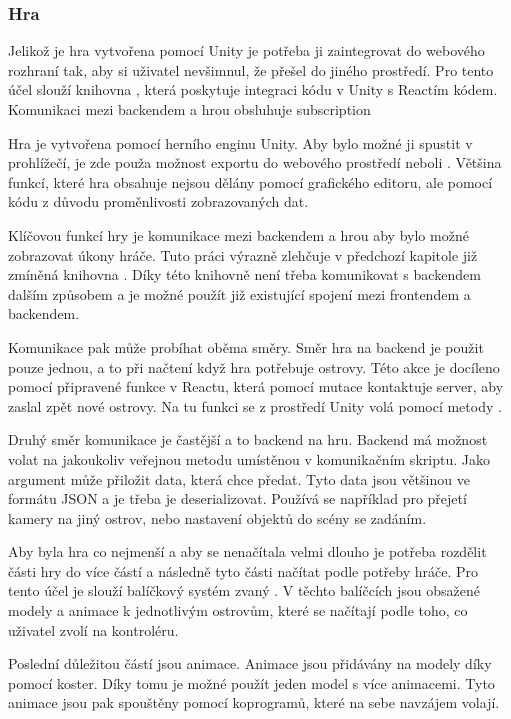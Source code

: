 \subsubsection{Hra}
Jelikož je hra vytvořena pomocí Unity je potřeba ji zaintegrovat do webového rozhraní tak, aby si uživatel nevšimnul, že přešel do jiného prostředí. Pro tento účel slouží knihovna \cite{react-unity-webgl}, která poskytuje integraci kódu v Unity s Reactím kódem. Komunikaci mezi backendem a hrou obsluhuje subscription \par

Hra je vytvořena pomocí herního enginu Unity. Aby bylo možné ji spustit v prohlížečí, je zde použa možnost exportu do webového prostředí neboli . Většina funkcí, které hra obsahuje nejsou dělány pomocí grafického editoru, ale pomocí kódu z důvodu proměnlivosti zobrazovaných dat.

Klíčovou funkcí hry je komunikace mezi backendem a hrou aby bylo možné zobrazovat úkony hráče. Tuto práci výrazně zlehčuje v předchozí kapitole již zmíněná knihovna \cite{react-unity-webgl}. Díky této knihovně není třeba komunikovat s backendem dalším způsobem a je možné použít již existující spojení mezi frontendem a backendem.\par
Komunikace pak může probíhat oběma směry. Směr hra na backend je použit pouze jednou, a to při načtení když hra potřebuje ostrovy. Této akce je docíleno pomocí připravené funkce v Reactu, která pomocí mutace  kontaktuje server, aby zaslal zpět nové ostrovy. Na tu funkci se z prostředí Unity volá pomocí metody .\par
Druhý směr komunikace je častější a to backend na hru. Backend má možnost volat na jakoukoliv veřejnou metodu umístěnou v komunikačním skriptu. Jako argument může přiložit data, která chce předat. Tyto data jsou většinou ve formátu JSON a je třeba je deserializovat. Používá se například pro přejetí kamery na jiný ostrov, nebo nastavení objektů do scény se zadáním.

Aby byla hra co nejmenší a aby se nenačítala velmi dlouho je potřeba rozdělit části hry do více částí a následně tyto části načítat podle potřeby hráče. Pro tento účel je slouží balíčkový systém zvaný \cite{AssetBundle}. V těchto balíčcích jsou obsažené modely a animace k jednotlivým ostrovům, které se načítají podle toho, co uživatel zvolí na kontroléru.

Poslední důležitou částí jsou animace. Animace jsou přidávány na modely díky pomocí koster. Díky tomu je možné použít jeden model s více animacemi. Tyto animace jsou pak spouštěny pomocí koprogramů, které na sebe navzájem volají. 
